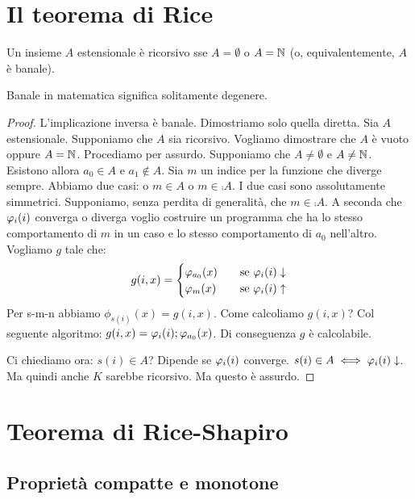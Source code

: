 \section{Il teorema di Rice}

\begin{thm}
    Un insieme $A$ estensionale è ricorsivo sse $A = \emptyset$ o $A = \mathbb{N}$ (o, equivalentemente,
    $A$ è banale).
\end{thm}

Banale in matematica significa solitamente degenere.

\begin{proof}
    L'implicazione inversa è banale. Dimostriamo solo quella diretta. Sia $A$ estensionale.
    Supponiamo che $A$ sia ricorsivo. Vogliamo dimostrare che $A$ è vuoto oppure $A = \mathbb{N}$.
    Procediamo per assurdo. Supponiamo che $A \not= \emptyset$ e $A \not= \mathbb{N}$. Esistono
    allora $a_{0} \in A$ e $a_{1} \notin A$. Sia $m$ un indice per la funzione che diverge sempre.
    Abbiamo due casi: o $m \in A$ o $m \in \comp{A}$. I due casi sono assolutamente simmetrici.
    Supponiamo, senza perdita di generalità, che $m \in \comp{A}$. A seconda che $\varphi_{i}(i)$ converga
    o diverga voglio costruire un programma che ha lo stesso comportamento di $m$ in un caso e lo
    stesso comportamento di $a_{0}$ nell'altro. Vogliamo $g$ tale che:
    \begin{equation*}
        g(i,x) = 
        \begin{cases}
            \varphi_{a_{0}}(x) \quad &\text{se $\varphi_{i}(i) \downarrow$} \\
            \varphi_{m}(x) \quad &\text{se $\varphi_{i}(i) \uparrow$} \\
        \end{cases}
    \end{equation*}
    Per s-m-n abbiamo $\phi_{s(i)}(x) = g(i,x)$. Come calcoliamo $g(i,x)$? Col seguente algoritmo:
    $g(i,x) = \varphi_{i}(i); \varphi_{a_{0}}(x)$. Di conseguenza $g$ è calcolabile. 
    
    Ci chiediamo ora: $s(i) \in A$? Dipende se $\varphi_{i}(i)$ converge. $s(i) \in A \iff \varphi_{i}(i)
    \downarrow$. Ma quindi anche $K$ sarebbe ricorsivo. Ma questo è assurdo.
\end{proof}

\section{Teorema di Rice-Shapiro}

\subsection{Proprietà compatte e monotone}

